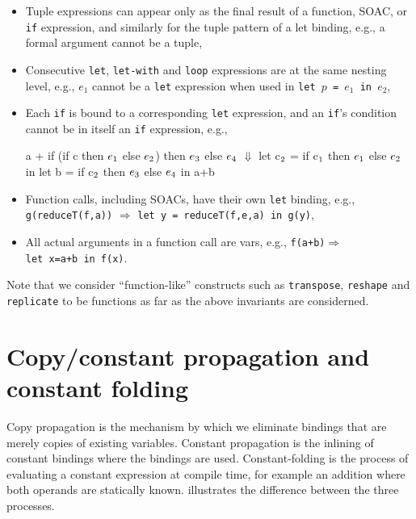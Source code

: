 \begin{itemize}
\item Tuple expressions can appear only as the final result of a
  function, SOAC, or \texttt{if} expression, and similarly for the
  tuple pattern of a let binding, e.g., a formal argument cannot be a
  tuple,
\item Consecutive \texttt{let}, \texttt{let-with} and \texttt{loop}
  expressions are at the same nesting level, e.g., $e_1$ cannot be a
  \texttt{let} expression when used in
  \texttt{let~$p$~=~$e_1$~in~$e_2$},
\item Each \texttt{if} is bound to a corresponding \texttt{let}
  expression, and an \texttt{if}'s condition cannot be in itself an
  \texttt{if} expression, e.g.,
\begin{center}
\begin{colorcode}
a + if (if c then \(e_{1}\) else \(e_{2}\))
    then \(e_{3}\)
    else \(e_{4}\)
  \(\Downarrow\)
let c\(_{2}\) = if c\(_{1}\) then \(e_{1}\) else \(e_{2}\) in
let b = if c\(_{2}\) then \(e_{3}\) else \(e_{4}\) in a+b
\end{colorcode}
\end{center}
\item Function calls, including SOACs, have their own \texttt{let}
  binding, e.g., \texttt{g(reduceT(f,a))} $\Rightarrow$
  \texttt{let~y~=~reduceT(f,e,a)~in~g(y)},
\item All actual arguments in a function call are vars, e.g.,
  \texttt{f(a+b)}$\Rightarrow$\texttt{let~x=a+b~in~f(x)}.
\end{itemize}

Note that we consider ``function-like'' constructs such as
\texttt{transpose}, \texttt{reshape} and \texttt{replicate} to be
functions as far as the above invariants are considerned.

\section{Copy/constant propagation and constant folding}

Copy propagation is the mechanism by which we eliminate bindings that
are merely copies of existing variables.  Constant propagation is the
inlining of constant bindings where the bindings are
used. Constant-folding is the process of evaluating a constant
expression at compile time, for example an addition where both
operands are statically known.
 illustrates the
difference between the three processes.


